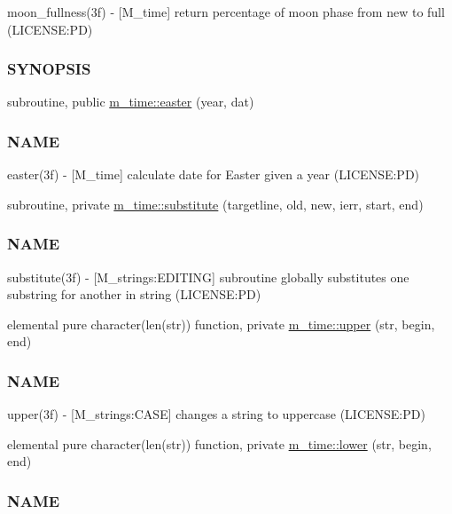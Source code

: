 \begin{DoxyCompactItemize}
\begin{DoxyCompactList}
moon\+\_\+fullness(3f) -\/ \mbox{[}M\+\_\+time\mbox{]} return percentage of moon phase from new to full (L\+I\+C\+E\+N\+SE\+:PD) \subsubsection*{S\+Y\+N\+O\+P\+S\+IS}\end{DoxyCompactList}\item 
subroutine, public \mbox{\hyperlink{namespacem__time_a5ccb70e20160fcf26bb403dbff1f138a}{m\+\_\+time\+::easter}} (year, dat)
\begin{DoxyCompactList}\small\item\em \subsubsection*{N\+A\+ME}

easter(3f) -\/ \mbox{[}M\+\_\+time\mbox{]} calculate date for Easter given a year (L\+I\+C\+E\+N\+SE\+:PD) \end{DoxyCompactList}\item 
subroutine, private \mbox{\hyperlink{namespacem__time_a3c8fc82ff0a77573d0f907d4d44dd9bd}{m\+\_\+time\+::substitute}} (targetline, old, new, ierr, start, end)
\begin{DoxyCompactList}\small\item\em \subsubsection*{N\+A\+ME}

substitute(3f) -\/ \mbox{[}M\+\_\+strings\+:E\+D\+I\+T\+I\+NG\mbox{]} subroutine globally substitutes one substring for another in string (L\+I\+C\+E\+N\+SE\+:PD) \end{DoxyCompactList}\item 
elemental pure character(len(str)) function, private \mbox{\hyperlink{namespacem__time_af7c0157f921a2716ede225374095c6f2}{m\+\_\+time\+::upper}} (str, begin, end)
\begin{DoxyCompactList}\small\item\em \subsubsection*{N\+A\+ME}

upper(3f) -\/ \mbox{[}M\+\_\+strings\+:C\+A\+SE\mbox{]} changes a string to uppercase (L\+I\+C\+E\+N\+SE\+:PD) \end{DoxyCompactList}\item 
elemental pure character(len(str)) function, private \mbox{\hyperlink{namespacem__time_a96597ff2f2eab2ede14e3a63bd49254a}{m\+\_\+time\+::lower}} (str, begin, end)
\begin{DoxyCompactList}\small\item\em \subsubsection*{N\+A\+ME}


\end{DoxyCompactList}
\end{DoxyCompactItemize}
